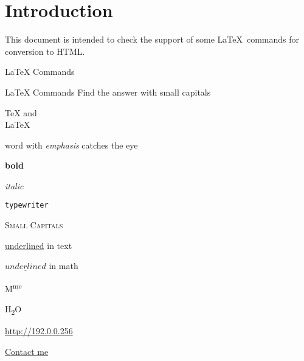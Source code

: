 \documentclass{article}
\begin{document}
\section*{Introduction}

This document is intended to check the support of some \LaTeX\ commands for 
conversion to HTML.

\begin{quiz}[points=1.0]{LaTeX Commands}
\begin{multi}{LaTeX Commands}
Find the answer with small capitals
\item \TeX{} and\\\relax \LaTeX%
\item word with \emph{emphasis} catches the eye
\item \textbf{bold}
\item \textit{italic}
\item \texttt{typewriter}
\item* \textsc{Small Capitals}
\item \underline{underlined} in text
\item $\underline{underlined}$ in math
\item M\textsuperscript{me}
\item H\textsubscript{2}O
\item \url{http://192.0.0.256}
\item \href{mailto:name@server.com}{Contact me}
\end{multi}

\end{quiz}
\end{document}

